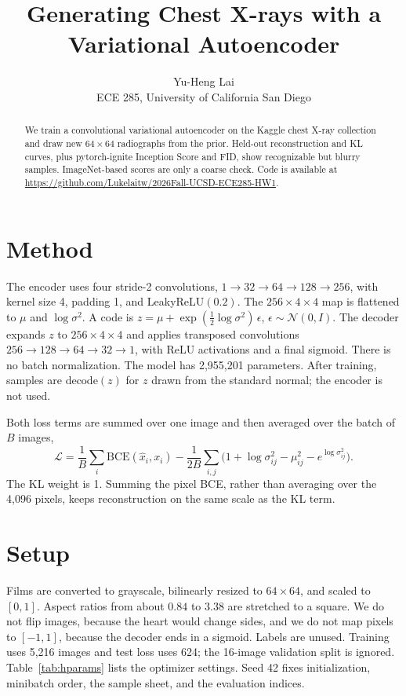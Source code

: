 \documentclass{article}
\title{Generating Chest X-rays with a Variational Autoencoder}
\author{Yu-Heng Lai \\ ECE 285, University of California San Diego}
\begin{document}
\maketitle

\begin{abstract}
We train a convolutional variational autoencoder on the Kaggle chest X-ray collection and draw new $64\times 64$ radiographs from the prior.
Held-out reconstruction and KL curves, plus pytorch-ignite Inception Score and FID, show recognizable but blurry samples.
ImageNet-based scores are only a coarse check.
Code is available at \url{https://github.com/Lukelaitw/2026Fall-UCSD-ECE285-HW1}.
\end{abstract}

\section{Method}
The encoder uses four stride-2 convolutions, $1\!\to\!32\!\to\!64\!\to\!128\!\to\!256$, with kernel size 4, padding 1, and LeakyReLU$(0.2)$.
The $256\times 4\times 4$ map is flattened to $\mu$ and $\log\sigma^2$.
A code is $z=\mu+\exp(\tfrac12\log\sigma^2)\,\epsilon$, $\epsilon\sim\mathcal{N}(0,I)$.
The decoder expands $z$ to $256\times 4\times 4$ and applies transposed convolutions $256\!\to\!128\!\to\!64\!\to\!32\!\to\!1$, with ReLU activations and a final sigmoid.
There is no batch normalization.
The model has 2,955,201 parameters.
After training, samples are $\mathrm{decode}(z)$ for $z$ drawn from the standard normal; the encoder is not used.

Both loss terms are summed over one image and then averaged over the batch of $B$ images,
\begin{equation}
\mathcal{L}
= \frac{1}{B}\sum_{i}\mathrm{BCE}(\hat x_i, x_i)
- \frac{1}{2B}\sum_{i,j}\bigl(1+\log\sigma^2_{ij}-\mu_{ij}^2-e^{\log\sigma^2_{ij}}\bigr).
\end{equation}
The KL weight is 1.
Summing the pixel BCE, rather than averaging over the 4,096 pixels, keeps reconstruction on the same scale as the KL term.

\section{Setup}
Films are converted to grayscale, bilinearly resized to $64\times 64$, and scaled to $[0,1]$.
Aspect ratios from about $0.84$ to $3.38$ are stretched to a square.
We do not flip images, because the heart would change sides, and we do not map pixels to $[-1,1]$, because the decoder ends in a sigmoid.
Labels are unused.
Training uses 5,216 images and test loss uses 624; the 16-image validation split is ignored.
Table~\ref{tab:hparams} lists the optimizer settings.
Seed 42 fixes initialization, minibatch order, the sample sheet, and the evaluation indices.
\end{document}
